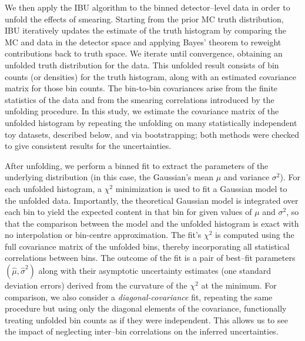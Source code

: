             We then apply the IBU algorithm to the binned detector--level data in order to unfold the effects of smearing.
            Starting from the prior MC truth distribution, IBU iteratively updates the estimate of the truth histogram by comparing the MC and data in the detector space and applying Bayes' theorem to reweight contributions back to truth space. 
            We iterate until convergence, obtaining an unfolded truth distribution for the data.
            This unfolded result consists of bin counts (or densities) for the truth histogram, along with an estimated covariance matrix for those bin counts.
            The bin-to-bin covariances arise from the finite statistics of the data and from the smearing correlations introduced by the unfolding procedure.
            In this study, we estimate the covariance matrix of the unfolded histogram by repeating the unfolding on many statistically independent toy datasets, described below, and via bootstrapping;
            both methods were checked to give consistent results for the uncertainties. 
    
            After unfolding, we perform a binned fit to extract the parameters of the underlying distribution (in this case, the Gaussian’s mean $\mu$ and variance $\sigma^2$).
            For each unfolded histogram, a $\chi^2$ minimization is used to fit a Gaussian model to the unfolded data.
            Importantly, the theoretical Gaussian model is integrated over each bin to yield the expected content in that bin for given values of $\mu$ and $\sigma^2$, so that the comparison between the model and the unfolded histogram is exact with no interpolation or bin-centre approximation.
            The fit’s $\chi^2$ is computed using the full covariance matrix of the unfolded bins, thereby incorporating all statistical correlations between bins.
            The outcome of the fit is a pair of best--fit parameters $(\hat{\mu}, \hat{\sigma}^2)$ along with their asymptotic uncertainty estimates (one standard deviation errors) derived from the curvature of the $\chi^2$ at the minimum.
            For comparison, we also consider a \emph{diagonal-covariance} fit, repeating the same procedure but using only the diagonal elements of the covariance, functionally treating unfolded bin counts as if they were independent.
            This allows us to see the impact of neglecting inter--bin correlations on the inferred uncertainties.
            
